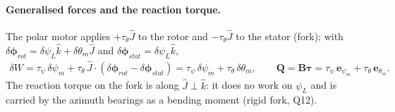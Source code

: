 \documentclass[10pt,a4paper]{article}
\numberwithin{equation}{section}
\begin{document}
\paragraph{Generalised forces and the reaction torque.} The polar motor applies $+\tau_\theta\hat J$ to the rotor and $-\tau_\theta\hat J$ to the stator (fork); with $\delta\boldsymbol\phi_{rot} = \delta\psi_L\hat k + \delta\theta_m\hat J$ and $\delta\boldsymbol\phi_{stat} = \delta\psi_L\hat k$,
\begin{gather}
\delta W = \tau_\psi\,\delta\psi_m + \tau_\theta\,\hat J\cdot\left(\delta\boldsymbol\phi_{rot} - \delta\boldsymbol\phi_{stat}\right) = \tau_\psi\,\delta\psi_m + \tau_\theta\,\delta\theta_m,\qquad \mathbf Q = \mathbf B\boldsymbol\tau = \tau_\psi\,\mathbf e_{\psi_m} + \tau_\theta\,\mathbf e_{\theta_m}.
\end{gather}
The reaction torque on the fork is along $\hat J\perp\hat k$: it does no work on $\psi_L$ and is carried by the azimuth bearings as a bending moment (rigid fork, Q12).
\end{document}

